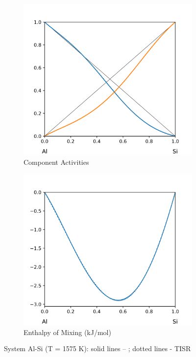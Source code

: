 \documentclass[12pt,abstract]{scrartcl}
\begin{document}
\begin{figure}
\centering
\begin{subfigure}{.5\textwidth}
  \centering
  \includegraphics[width=1\linewidth]{Al-Si_Activity}
  \caption{Component Activities}
  \label{fig:sub1}
\end{subfigure}%
\begin{subfigure}{.5\textwidth}
  \centering
  \includegraphics[width=1\linewidth]{Al-Si_Enthalpy}
  \caption{Enthalpy of Mixing (kJ/mol)}
  \label{fig:sub2}
\end{subfigure}
\caption{System Al-Si (T = 1575 K): solid lines -- \cite{Al-Si_Data}; dotted lines - TISR}
\label{fig:Al-Si} 
\end{figure}
\end{document}
